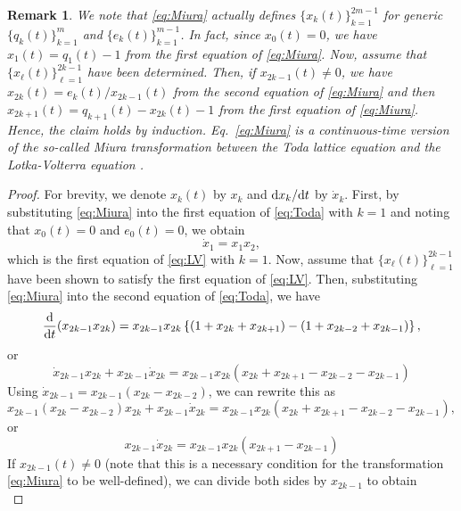 \documentclass[pdflatex,sn-mathphys-num]{sn-jnl}%
\theoremstyle{thmstyleone}%
\theoremstyle{thmstyletwo}%
\newtheorem{remark}{Remark}%
\theoremstyle{thmstylethree}%
\begin{document}
\begin{appendices}
\begin{remark}
We note that \eqref{eq:Miura} actually defines $\{x_k(t)\}_{k=1}^{2m-1}$ for generic $\{q_k(t)\}_{k=1}^m$ and $\{e_k(t)\}_{k=1}^{m-1}$. In fact, since $x_0(t)=0$, we have $x_1(t)=q_1(t)-1$ from the first equation of \eqref{eq:Miura}. Now, assume that $\{x_{\ell}(t)\}_{\ell=1}^{2k-1}$ have been determined. Then, if $x_{2k-1}(t)\ne 0$, we have $x_{2k}(t)=e_k(t)/x_{2k-1}(t)$ from the second equation of \eqref{eq:Miura} and then $x_{2k+1}(t)=q_{k+1}(t)-x_{2k}(t)-1$ from the first equation of \eqref{eq:Miura}. Hence, the claim holds by induction. Eq.~\eqref{eq:Miura} is a continuous-time version of the so-called Miura transformation between the Toda lattice equation and the Lotka-Volterra equation \cite{Hirota95}.
\end{remark}
\begin{proof}
For brevity, we denote $x_k(t)$ by $x_k$ and ${\rm d}x_k/{\rm d}t$ by $\dot{x}_k$. First, by substituting \eqref{eq:Miura} into the first equation of \eqref{eq:Toda} with $k=1$ and noting that $x_0(t)=0$ and $e_0(t)=0$, we obtain
\begin{equation}
\dot{x}_1=x_1 x_2,
\end{equation}
which is the first equation of \eqref{eq:LV} with $k=1$. Now, assume that $\{x_{\ell}(t)\}_{\ell=1}^{2k-1}$ have been shown to satisfy the first equation of \eqref{eq:LV}. Then, substituting \eqref{eq:Miura} into the second equation of \eqref{eq:Toda}, we have
\begin{equation}
\frac{\rm d}{{\rm d}t}(x_{2k-1}x_{2k})=x_{2k-1}x_{2k}\left\{(1+x_{2k}+x_{2k+1})-(1+x_{2k-2}+x_{2k-1})\right\},
\end{equation}
or
\begin{equation}
\dot{x}_{2k-1}x_{2k}+ x_{2k-1}\dot{x}_{2k}=x_{2k-1}x_{2k}(x_{2k}+x_{2k+1}-x_{2k-2}-x_{2k-1})
\end{equation}
Using $\dot{x}_{2k-1}=x_{2k-1}(x_{2k}-x_{2k-2})$, we can rewrite this as
\begin{equation}
x_{2k-1}(x_{2k}-x_{2k-2})x_{2k}+ x_{2k-1}\dot{x}_{2k}=x_{2k-1}x_{2k}(x_{2k}+x_{2k+1}-x_{2k-2}-x_{2k-1}),
\end{equation}
or
\begin{equation}
x_{2k-1}\dot{x}_{2k}=x_{2k-1}x_{2k}(x_{2k+1}-x_{2k-1})
\end{equation}
If $x_{2k-1}(t)\ne 0$ (note that this is a necessary condition for the transformation \eqref{eq:Miura} to be well-defined), we can divide both sides by $x_{2k-1}$ to obtain
\begin{equation}

\end{equation}
\end{proof}
\end{appendices}
\end{document}
